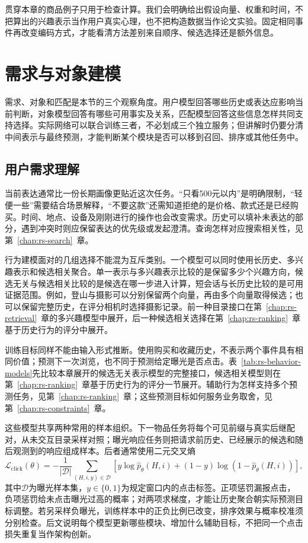 贯穿本章的商品例子只用于检查计算。我们会明确给出假设向量、权重和时间，不把算出的兴趣表示当作用户真实心理，也不把构造数据当作论文实验。固定相同事件再改变编码方式，才能看清方法差别来自顺序、候选选择还是额外信息。

\section{需求与对象建模}
\label{sec:rs-understanding-models}

需求、对象和匹配是本节的三个观察角度。用户模型回答哪些历史或表达应影响当前判断，对象模型回答有哪些可用事实及关系，匹配模型回答这些信息怎样共同支持选择。实际网络可以联合训练三者，不必划成三个独立服务；但讲解时仍要分清中间表示与最终预测，才能判断某个模块是否可以移到召回、排序或其他任务中。

\subsection{用户需求理解}
\label{sec:rs-user-understanding}

当前表达通常比一份长期画像更贴近这次任务。“只看500元以内”是明确限制，“轻便一些”需要结合场景解释，“不要这款”还需知道拒绝的是价格、款式还是已经购买。时间、地点、设备及刚刚进行的操作也会改变需求。历史可以填补未表达的部分，遇到冲突时则应保留表达的优先级或发起澄清。查询怎样对应搜索相关性，见第~\ref{chap:rs-search}~章。

行为建模面对的几组选择不能混为互斥类别。一个模型可以同时使用长历史、多兴趣表示和候选相关聚合。单一表示与多兴趣表示比较的是保留多少个兴趣方向，候选无关与候选相关比较的是候选在哪一步进入计算，短会话与长历史比较的是可用证据范围。例如，登山与摄影可以分别保留两个向量，再由多个向量取得候选；也可以保留完整历史，在评分相机时选择摄影记录。前一种目录接口在第~\ref{chap:rs-retrieval}~章的多兴趣模型中展开，后一种候选相关选择在第~\ref{chap:rs-ranking}~章基于历史行为的评分中展开。

训练目标同样不能由输入形式推断。使用购买和收藏历史，不表示两个事件具有相同价值；预测下一次浏览，也不同于预测给定曝光是否点击。表~\ref{tab:rs-behavior-models}先比较本章展开的候选无关表示模型的完整接口，候选相关模型则在第~\ref{chap:rs-ranking}~章基于历史行为的评分一节展开。辅助行为怎样支持多个预测任务，见第~\ref{chap:rs-ranking}~章；这些预测目标如何服务业务取舍，见第~\ref{chap:rs-constraints}~章。

这些模型共享两种常用的样本组织。下一物品任务将每个可见前缀与真实后继配对，从未交互目录采样对照；曝光响应任务则把请求前历史、已经展示的候选和随后观测到的响应组成样本。后者通常使用二元交叉熵
\begin{equation}
  \mathcal{L}_{\mathrm{click}}(\theta)
    =-\frac{1}{|\mathcal{D}|}\sum_{(H,i,y)\in\mathcal{D}}
       \left[y\log\widehat p_\theta(H,i)
         +(1-y)\log(1-\widehat p_\theta(H,i))\right],
  \label{eq:rs-understanding-click}
\end{equation}
其中$\mathcal{D}$为曝光样本集，$y\in\{0,1\}$为规定窗口内的点击标签。正项惩罚漏报点击，负项惩罚给未点击曝光过高的概率；对两项求梯度，才能让历史聚合朝实际预测目标调整。若另采样负曝光，训练样本中的正负比例已改变，排序效果与概率校准须分别检查。后文说明每个模型更新哪些模块、增加什么辅助目标，不把同一个点击损失重复当作架构创新。

